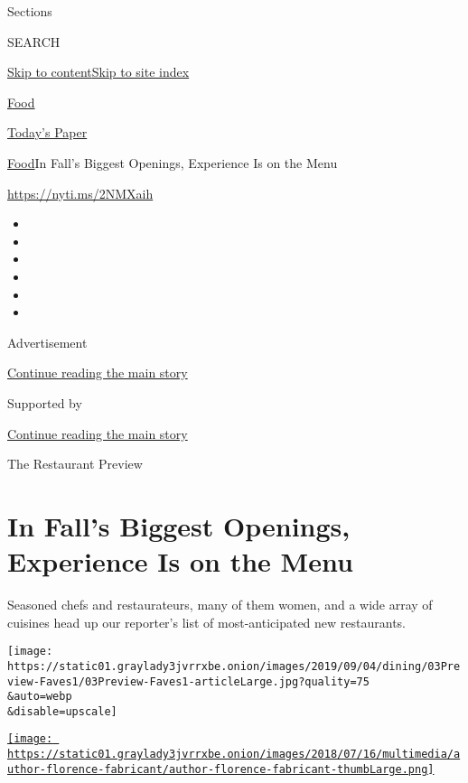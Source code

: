 Sections

SEARCH

\protect\hyperlink{site-content}{Skip to
content}\protect\hyperlink{site-index}{Skip to site index}

\href{https://www.nytimes3xbfgragh.onion/section/food}{Food}

\href{https://myaccount.nytimes3xbfgragh.onion/auth/login?response_type=cookie\&client_id=vi}{}

\href{https://www.nytimes3xbfgragh.onion/section/todayspaper}{Today's
Paper}

\href{/section/food}{Food}\textbar{}In Fall's Biggest Openings,
Experience Is on the Menu

\url{https://nyti.ms/2NMXaih}

\begin{itemize}
\item
\item
\item
\item
\item
\item
\end{itemize}

Advertisement

\protect\hyperlink{after-top}{Continue reading the main story}

Supported by

\protect\hyperlink{after-sponsor}{Continue reading the main story}

The Restaurant Preview

\hypertarget{in-falls-biggest-openings-experience-is-on-the-menu}{%
\section{In Fall's Biggest Openings, Experience Is on the
Menu}\label{in-falls-biggest-openings-experience-is-on-the-menu}}

Seasoned chefs and restaurateurs, many of them women, and a wide array
of cuisines head up our reporter's list of most-anticipated new
restaurants.

\texttt{[image: https://static01.graylady3jvrrxbe.onion/images/2019/09/04/dining/03Preview-Faves1/03Preview-Faves1-articleLarge.jpg?quality=75\\\&auto=webp\\\&disable=upscale]}

\href{https://www.nytimes3xbfgragh.onion/by/florence-fabricant}{\texttt{[image: https://static01.graylady3jvrrxbe.onion/images/2018/07/16/multimedia/author-florence-fabricant/author-florence-fabricant-thumbLarge.png]}}

